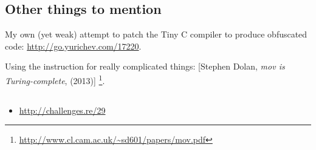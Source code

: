 \subsection{Other things to mention}

My own (yet weak) attempt to patch the Tiny C compiler to produce obfuscated code: \url{http://go.yurichev.com/17220}.

Using the \MOV 
instruction for really complicated things: 
[Stephen Dolan, \emph{mov is Turing-complete}, (2013)]
\footnote{\AlsoAvailableAs \url{http://www.cl.cam.ac.uk/~sd601/papers/mov.pdf}}. 

\subsection{\Exercise}

\begin{itemize}
	\item \url{http://challenges.re/29}
\end{itemize}


